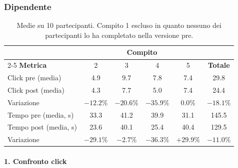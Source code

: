\subsubsection{Dipendente}
\begin{table}[h!]
    \centering
    \small
    \begin{tabular}{lccccc}
        \toprule
        & \multicolumn{4}{c}{\textbf{Compito}} & \\
        \cmidrule(lr){2-5}
        \textbf{Metrica} & 2 & 3 & 4 & 5 & \textbf{Totale} \\
        \midrule
        Click pre (media)   & 4.9 & 9.7 & 7.8 & 7.4 & 29.8 \\
        Click post (media)  & 4.3 & 7.7 & 5.0 & 7.4 & 24.4 \\
        Variazione          & $-12.2\%$ & $-20.6\%$ & $-35.9\%$ & $0.0\%$ & $-18.1\%$ \\
        \midrule
        Tempo pre (media, s)  & 33.3 & 41.2 & 39.9 & 31.1 & 145.5 \\
        Tempo post (media, s) & 23.6 & 40.1 & 25.4 & 40.4 & 129.5 \\
        Variazione            & $-29.1\%$ & $-2.7\%$ & $-36.3\%$ & $+29.9\%$ & $-11.0\%$ \\
        \bottomrule
    \end{tabular}
    \caption*{\small Medie su 10 partecipanti. Compito 1 escluso in quanto nessuno dei partecipanti lo ha completato nella versione pre.}
\end{table}

\paragraph{1. Confronto click}

